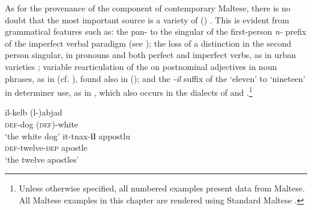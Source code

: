 \documentclass[output=paper]{langsci/langscibook}
\begin{document}
As for the provenance of the  component of contemporary Maltese, there is no doubt that the most important source is a variety of  () . This is evident from grammatical features such as: the pan-  to the singular of the first-person \textit{n-} prefix of the imperfect verbal paradigm
(see ); the loss of a  distinction in the second person singular, in pronouns and both perfect and imperfect verbs, as in urban   varieties \citep{Gibson2011}; variable rearticulation of the   on postnominal adjectives in  noun phrases, as in  (cf. \citealt{Gatt2018}), found also in   (\citealt[205]{Harrell2004}); and the \textit{-il} suffix of the  `eleven' to `nineteen' in determiner use, as in , which also occurs in the  dialects of  \citep{Caubet2011} and  \citep{Taine-Cheikh2011numerals}.\footnote{Unless otherwise specified, all numbered examples present data from Maltese. All Maltese examples in this chapter are rendered using  Standard Maltese .}\largerpage


\begin{table}
\caption{First-person imperfect `write' in Eastern and Western Arabic}
\label{niktib}
\end{table}

\begin{multicols}{2}
\ea\label{ex:optionalarticle}
\gll il-kelb (l-)abjad\\
     \textsc{def}-dog (\textsc{def})-white\\
\glt `the white dog'
\ex\label{ex:apostles}
\gll it-tnax-\textbf{il} appostlu\\
     \textsc{def}-twelve-\textsc{dep} apostle\\
\glt `the twelve apostles'
\z
\end{multicols}
\end{document}
